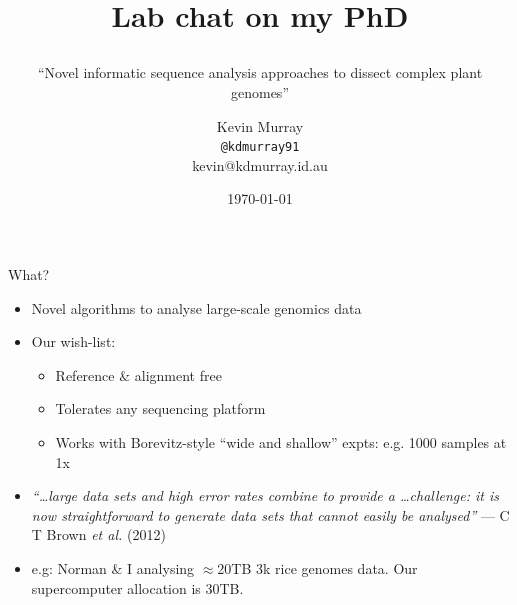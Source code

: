 \documentclass[t]{beamer}
\title{Lab chat on my PhD
  \subtitle{``Novel informatic sequence analysis approaches to dissect complex
              plant genomes''}
\author{Kevin Murray\\\tiny{\texttt{@kdmurray91}\\kevin@kdmurray.id.au}}
\institute{Borevitz Lab, ANU}
\date{\today}
}
\begin{document}
{
\begin{frame}
  \titlepage
  \vfill
\end{frame}
}

\begin{frame}{What?}
  \begin{itemize}
    \item Novel algorithms to analyse large-scale genomics data
  \pause
    \item Our wish-list:
    \begin{itemize}
      \item Reference \& alignment free
      \item Tolerates any sequencing platform
      \item Works with Borevitz-style ``wide and shallow'' expts: e.g. 1000
        samples at 1x
    \end{itemize}
  \pause
    \item \textit{``\ldots large data sets and high error rates combine to
                    provide a \ldots challenge: it is now straightforward to
                    generate data sets that cannot easily be analysed''}
                    --- C T Brown \textit{et al.} (2012)
  \pause
    \item e.g: Norman \& I analysing $\approx$20TB 3k rice genomes data. Our
      supercomputer allocation is 30TB.
  \end{itemize}
\end{frame}
\end{document}
